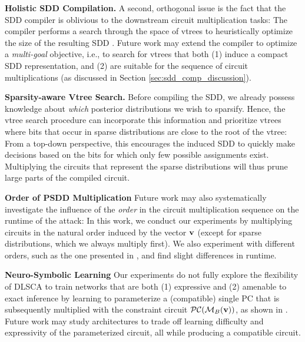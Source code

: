 
\textbf{Holistic SDD Compilation.} 
A second, orthogonal issue is the fact that the SDD compiler is oblivious to the downstream circuit multiplication tasks: The compiler performs a search through the space of vtrees to heuristically optimize the size of the resulting SDD \cite{dynamic_min_choi}. Future work may extend the compiler to optimize a \emph{multi-goal} objective, i.e., to search for vtrees that both (1) induce a compact SDD representation, and (2) are suitable for the sequence of circuit multiplications (as discussed in Section \ref{sec:sdd_comp_discussion}).

\textbf{Sparsity-aware Vtree Search.} Before compiling the SDD, we already possess knowledge about \emph{which} posterior distributions we wish to sparsify. Hence, the vtree search procedure can incorporate this information and prioritize vtrees where bits that occur in sparse distributions are close to the root of the vtree: From a top-down perspective, this encourages the induced SDD to quickly make decisions based on the bits for which only few possible assignments exist. Multiplying the circuits that represent the sparse distributions will thus prune large parts of the compiled circuit.

\textbf{Order of PSDD Multiplication} Future work may also systematically investigate the influence of the \emph{order} in the circuit multiplication sequence on the runtime of the attack: In this work, we conduct our experiments by multiplying circuits in the natural order induced by the vector $\mathbf{v}$ (except for sparse distributions, which we always multiply first). We also experiment with different orders, such as the one presented in \cite{tractable_ops}, and find slight differences in runtime. 

\textbf{Neuro-Symbolic Learning} Our experiments do not fully explore the flexibility of DLSCA to train networks that are both (1) expressive and (2) amenable to exact inference by learning to parameterize a (compatible) single PC that is subsequently multiplied with the constraint circuit $\mathcal{PC}(\mathcal{M}_B(\mathbf{v}))$, as shown in \cite{spl}. Future work may study architectures to trade off learning difficulty and expressivity of the parameterized circuit, all while producing a compatible circuit.


